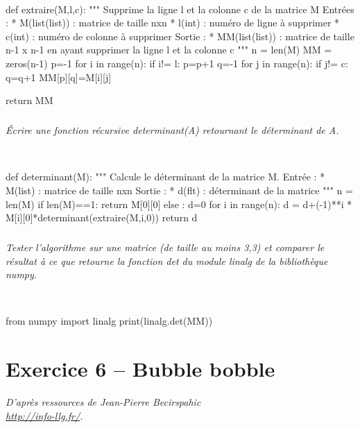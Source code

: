 \documentclass[10pt,fleqn]{article} %
\begin{document}
\begin{multicols}{2}
\begin{corrige}
~\\
\begin{python}
def extraire(M,l,c):
    """
    Supprime la ligne l et la colonne c de 
    la matrice M
    Entrées :
     * M(list(list)) : matrice de taille nxn
     * l(int) : numéro de ligne à supprimer
     * c(int) : numéro de colonne à supprimer
    Sortie : 
     * MM(list(list)) : matrice de taille n-1 x n-1 
     en ayant supprimer la ligne l et la colonne c
    """
    n = len(M)
    MM = zeros(n-1)
    p=-1
    for i in range(n):
        if i!= l:
            p=p+1
            q=-1
            for j in range(n):
                if j!= c:
                    q=q+1
                    MM[p][q]=M[i][j]
    
    return MM
\end{python}
\end{corrige}
\else
\fi
\subparagraph{}
\textit{Écrire une fonction récursive \textsl{determinant(A)} retournant le déterminant de \textsl{A}.}
\ifprof
\begin{corrige}
~\\
\begin{python}
def determinant(M):
    """
    Calcule le déterminant de la matrice M.
    Entrée : 
     * M(list) : matrice de taille nxn
    Sortie : 
     * d(flt) : déterminant de la matrice
    """
    n = len(M)
    if len(M)==1:
        return M[0][0]
    else :
        d=0
        for i in range(n):
            d = d+(-1)**i * M[i][0]*determinant(extraire(M,i,0))
    return d
\end{python}
\end{corrige}
\else
\fi

\subparagraph{}
\textit{Tester l’algorithme sur une matrice (de taille au moins 3,3) et comparer le résultat à ce
que retourne la fonction \textsl{det} du module \textsl{linalg} de la bibliothèque \textsl{numpy}.}
\ifprof
\begin{corrige}
~\\
\begin{python}
from numpy import linalg
print(linalg.det(MM))
\end{python}
\end{corrige}
\else
\fi


\section*{Exercice 6 -- Bubble bobble}
\textit{ D'après ressources de Jean-Pierre Becirspahic   \\ \indent \url{http://info-llg.fr/}.}
\setcounter{exo}{0}


\end{multicols}
\end{document}
